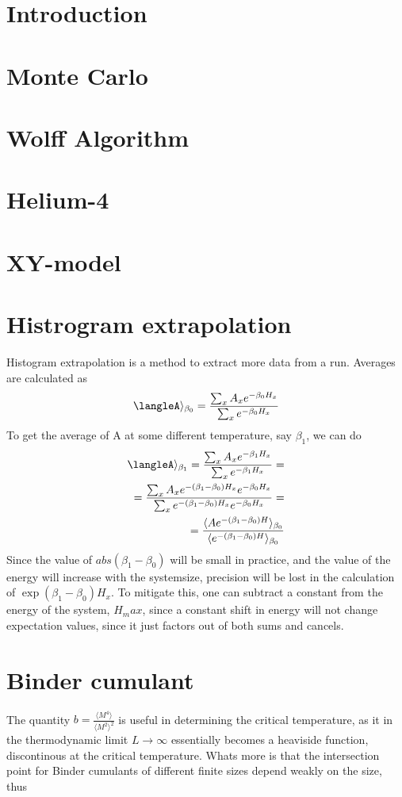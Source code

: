 \documentclass[a4paper]{article}
\begin{document}
\section{Introduction}
\section{Monte Carlo}
\section{Wolff Algorithm}
\section{Helium-4}
\section{XY-model}
\section{Histrogram extrapolation}
Histogram extrapolation is a method to extract more data from a run. 
Averages are calculated as
\begin{equation}
  \langleA\rangle_{\beta_0} =  \frac{\sum_{x}A_x e^{-\beta_0 H_x}}{\sum_{x}e^{-\beta_0 H_x}}
  \label{}
\end{equation}
To get the average of A at some different temperature, say $\beta_1$, we can do
\begin{align}
  \langleA\rangle_{\beta_1} =  \frac{\sum_{x}A_x e^{-\beta_1 H_x}}{\sum_{x}e^{-\beta_1 H_x}} = \\
  = \frac{\sum_x A_x e^{-(\beta_1 - \beta_0)H_x} e^{-\beta_0 H_x}}{\sum_x e^{-(\beta_1 - \beta_0)H_x}e^{-\beta_0 H_x}} = \\
  = \frac{\langle A e^{-(\beta_1 - \beta_0)H}\rangle_{\beta_0}}{\langle e^{-(\beta_1 - \beta_0)H}\rangle_{\beta_0}}
\end{align}
Since the value of $abs(\beta_1 -\beta_0)$ will be small in practice, and the value of the energy will increase with the systemsize, precision will be lost in the calculation of $\exp\left( \beta_1 - \beta_0 \right)H_x$. To mitigate this, one can subtract a constant from the energy of the system, $H_max$, since a constant shift in energy will not change expectation values, since it just factors out of both sums and cancels.
\section{Binder cumulant}
The quantity $b =\frac{\langle M^4 \rangle}{\langle M^2\rangle^2}$ is useful in determining the critical temperature, as it in the thermodynamic limit $L\rightarrow \infty $ essentially becomes a heaviside function, discontinous at the critical temperature. Whats more is that the intersection point for Binder cumulants of different finite sizes depend weakly on the size, thus 
\end{document}
